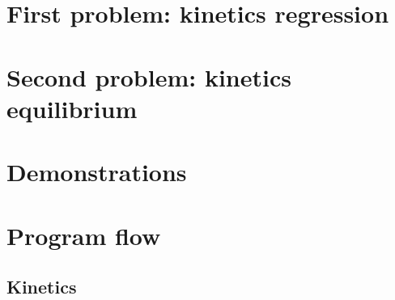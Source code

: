 \documentclass{article}
\begin{document}
\section{First problem: kinetics regression}


\section{Second problem: kinetics equilibrium}


\appendix
\section{Demonstrations}
\label{demo}


\section{Program flow}
\label{progflow}
\subsection{Kinetics}
\label{progflow:kinetics}

\end{document}
